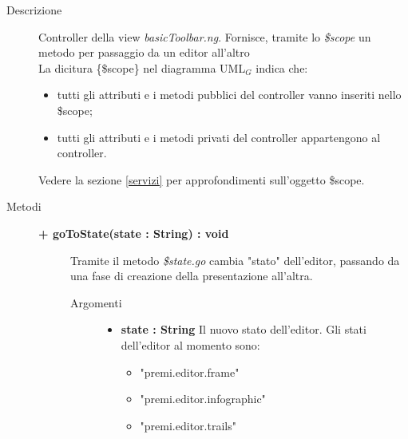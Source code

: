 \begin{description}
\item[Descrizione] \hfill
	Controller della view \textit{basicToolbar.ng}. Fornisce, tramite lo \textit{\$scope} un metodo per passaggio da un editor all'altro
	\\ La dicitura \{\$scope\} nel diagramma UML$_G$ indica che:
\begin{itemize}
\item tutti gli attributi e i metodi pubblici del controller vanno inseriti nello \$scope;
\item tutti gli attributi e i metodi privati del controller appartengono al controller.
\end{itemize}
Vedere la sezione \ref{servizi} per approfondimenti sull'oggetto \$scope.
	
\item[Metodi] \hfill

	\begin{description}
		\item[\textbf{\color{blue}+ goToState(state : String) : void			}] \hfill
			Tramite il metodo \textit{\$state.go} cambia "stato" dell'editor, passando da una fase di creazione della presentazione all'altra.
			
		\begin{description}
			\item[Argomenti] \hfill
				\begin{itemize}
				
					\item \textbf{state : String			} \hfill
					Il nuovo stato dell'editor. Gli stati dell'editor al momento sono:
					\begin{itemize}
						\item "premi.editor.frame"
						\item "premi.editor.infographic"
						\item "premi.editor.trails"
					\end{itemize}
					
				\end{itemize}
		\end{description}
	\end{description}
		
\end{description}



